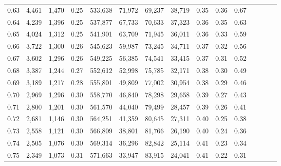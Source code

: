 \begin{tabular}{rrrcrrrrrrrrrrr}
0.63 &   4,461 &  1,470 &                                       0.25 &  533,638 &   71,972 &   69,237 &   38,719 &  0.35 &  0.36 &                         0.67 \\
0.64 &   4,239 &  1,396 &                                       0.25 &  537,877 &   67,733 &   70,633 &   37,323 &  0.36 &  0.35 &                         0.63 \\
0.65 &   4,024 &  1,312 &                                       0.25 &  541,901 &   63,709 &   71,945 &   36,011 &  0.36 &  0.33 &                         0.59 \\
0.66 &   3,722 &  1,300 &                                       0.26 &  545,623 &   59,987 &   73,245 &   34,711 &  0.37 &  0.32 &                         0.56 \\
0.67 &   3,602 &  1,296 &                                       0.26 &  549,225 &   56,385 &   74,541 &   33,415 &  0.37 &  0.31 &                         0.52 \\
0.68 &   3,387 &  1,244 &                                       0.27 &  552,612 &   52,998 &   75,785 &   32,171 &  0.38 &  0.30 &                         0.49 \\
0.69 &   3,189 &  1,217 &                                       0.28 &  555,801 &   49,809 &   77,002 &   30,954 &  0.38 &  0.29 &                         0.46 \\
0.70 &   2,969 &  1,296 &                                       0.30 &  558,770 &   46,840 &   78,298 &   29,658 &  0.39 &  0.27 &                         0.43 \\
0.71 &   2,800 &  1,201 &                                       0.30 &  561,570 &   44,040 &   79,499 &   28,457 &  0.39 &  0.26 &                         0.41 \\
0.72 &   2,681 &  1,146 &                                       0.30 &  564,251 &   41,359 &   80,645 &   27,311 &  0.40 &  0.25 &                         0.38 \\
0.73 &   2,558 &  1,121 &                                       0.30 &  566,809 &   38,801 &   81,766 &   26,190 &  0.40 &  0.24 &                         0.36 \\
0.74 &   2,505 &  1,076 &                                       0.30 &  569,314 &   36,296 &   82,842 &   25,114 &  0.41 &  0.23 &                         0.34 \\
0.75 &   2,349 &  1,073 &                                       0.31 &  571,663 &   33,947 &   83,915 &   24,041 &  0.41 &  0.22 &                         0.31 \\

\end{tabular}
